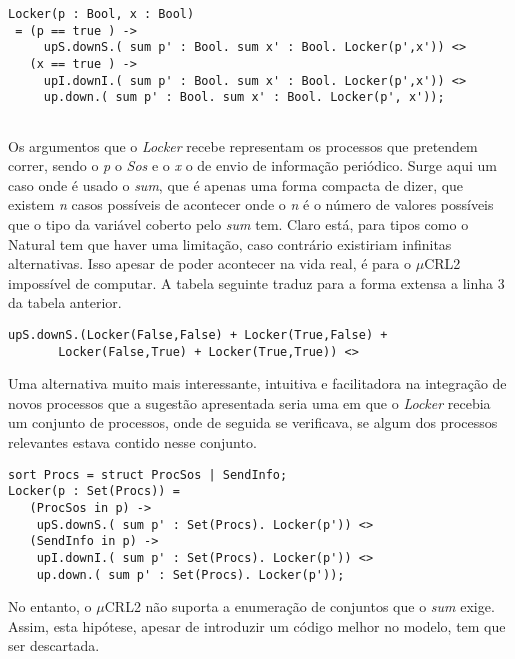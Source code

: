 \documentclass[a4paper,11pt]{article}
\newcommand{\mc}{$\mu$CRL2}
\begin{document}
\begin{lstlisting}
Locker(p : Bool, x : Bool)		
 = (p == true ) -> 
     upS.downS.( sum p' : Bool. sum x' : Bool. Locker(p',x')) <>
   (x == true ) -> 
     upI.downI.( sum p' : Bool. sum x' : Bool. Locker(p',x')) <>
     up.down.( sum p' : Bool. sum x' : Bool. Locker(p', x')); 
	
\end{lstlisting}

Os argumentos que o \emph{Locker} recebe representam os processos 
que pretendem correr, sendo o \emph{p} o \emph{Sos} e o \emph{x} o de envio de informação periódico.
Surge aqui um caso onde é usado o \emph{sum}, que é apenas uma forma compacta de dizer, que existem \emph{n} casos possíveis de acontecer onde o \emph{n}
é o número de valores possíveis que o tipo da variável coberto pelo \emph{sum} tem. Claro está, para tipos como o Natural tem que haver uma limitação, caso contrário
existiriam infinitas alternativas. Isso apesar de poder acontecer na vida real, é para o \mc{} impossível de computar.
A tabela seguinte traduz para a forma extensa a linha 3 da tabela anterior. 

\begin{lstlisting}
upS.downS.(Locker(False,False) + Locker(True,False) + 
	   Locker(False,True) + Locker(True,True)) <>
\end{lstlisting}

Uma alternativa muito mais interessante, intuitiva e facilitadora na integração de novos processos que a sugestão apresentada 
seria uma em que o \emph{Locker} recebia um conjunto de processos, onde de seguida se verificava, se
algum dos processos relevantes estava contido nesse conjunto.

\begin{lstlisting}
sort Procs = struct ProcSos | SendInfo; 
Locker(p : Set(Procs)) = 
   (ProcSos in p) -> 
	upS.downS.( sum p' : Set(Procs). Locker(p')) <>
   (SendInfo in p) ->	
 	upI.downI.( sum p' : Set(Procs). Locker(p')) <>
	up.down.( sum p' : Set(Procs). Locker(p')); 

\end{lstlisting}

No entanto, o \mc{} não suporta a enumeração de conjuntos que o \emph{sum} exige. Assim, esta hipótese, apesar de introduzir um  código melhor 
no modelo, tem que ser descartada. 
\end{document}
